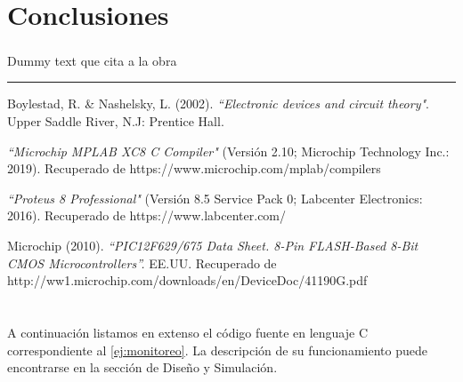 \documentclass[a4paper]{article}
\let\originalcite\cite
\renewcommand{\cite}[2][]{\textsuperscript{\originalcite{#2}}}
\let\originalappendix\appendix
\renewcommand{\appendix}{%
    \newpage\originalappendix\pagenumbering{gobble}%
    \renewcommand\thesection{Anexo \Alph{section}}
    \setcounter{secnumdepth}{1}
}
\begin{document}
\section{Conclusiones}
Dummy text que cita a la obra \cite{bib:boylestad}

\noindent\rule{\textwidth}{1pt}

\begin{thebibliography}{9}

Boylestad, R. \& Nashelsky, L. (2002). 
\textit{``Electronic devices and circuit theory"}.
Upper Saddle River, N.J: Prentice Hall.

\textit{``Microchip MPLAB XC8 C Compiler"}
(Versión 2.10; Microchip Technology Inc.: 2019).
Recuperado de https://www.microchip.com/mplab/compilers

\textit{``Proteus 8 Professional"} 
(Versión 8.5 Service Pack 0; Labcenter Electronics: 2016).
Recuperado de https://www.labcenter.com/

Microchip (2010).
\textit{``PIC12F629/675 Data Sheet. 8-Pin FLASH-Based 8-Bit CMOS 
Microcontrollers''.}
EE.UU. Recuperado de 
http://ww1.microchip.com/downloads/en/DeviceDoc/41190G.pdf
\end{thebibliography}

\appendix

\section{}\label{ane:monitoreo}
A continuación listamos en extenso el código fuente en lenguaje C
correspondiente al \ref{ej:monitoreo}. La descripción de su 
funcionamiento puede encontrarse en la sección de Diseño y 
Simulación.



\newpage
\section{}
\end{document}
